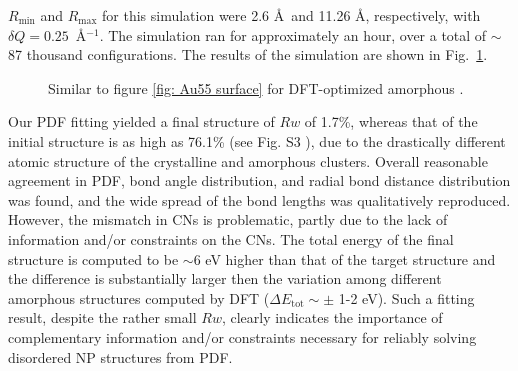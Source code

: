  $R_\mathrm{min}$ and $R_\mathrm{max}$ for this simulation were 2.6 \AA ~and 11.26 \AA, respectively, with $\delta Q=0.25$~\AA$^{-1}$. The simulation ran for approximately an hour,  over a total of $\sim$87 thousand configurations.  The results of the simulation are shown in Fig.~\ref{fig:Au55 amorphous}.
\begin{figure}
    \def \localimgpath {./Au_55_DFT_amorphous_HMC_paper_final/55d80747d2d355710ddb3fe5}
    \centering
  \captionsetup[subfigure]{labelformat=simple}
    \quad
    \quad
    \quad
    \quad
    \quad
    \quad

  \caption{Similar to figure \ref{fig: Au55 surface} for  DFT-optimized amorphous . }
        \label{fig:Au55 amorphous}
\end{figure}

Our PDF fitting yielded a final structure of  $Rw$ of 1.7\%, whereas that of the initial structure is as high as 76.1\% (see Fig. S3 ), due to the drastically different atomic structure of the crystalline and amorphous  clusters.
 Overall reasonable agreement in PDF, bond angle distribution, and radial bond distance distribution was found,  and the wide spread of the bond lengths was qualitatively reproduced.
 However, the mismatch in CNs is  problematic, partly due to the lack of information and/or constraints on the CNs.
The total energy of the final structure is computed to be $\sim 6$ eV higher than that of the target structure and the difference is substantially larger then the variation among different amorphous structures computed by DFT ($\Delta E_\mathrm{tot}\sim \pm$ 1-2 eV). Such a fitting result, despite the rather small $Rw$, clearly indicates the importance of complementary information and/or constraints necessary for reliably solving disordered NP structures from PDF.

